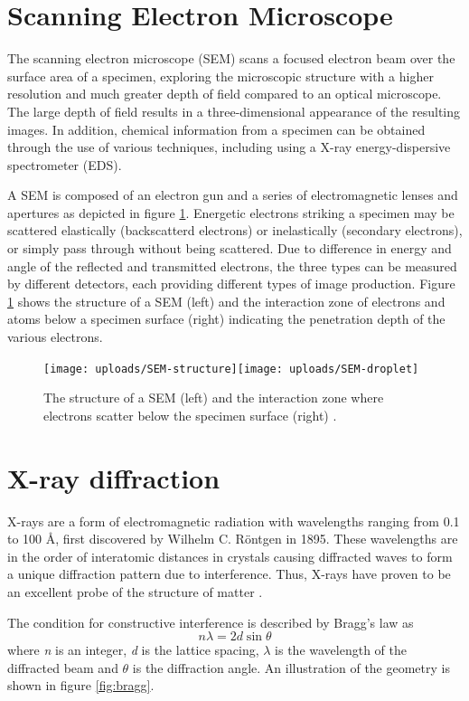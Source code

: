 \documentclass[Main/main.tex]{subfiles}
\begin{document}
\section{Scanning Electron Microscope}
The scanning electron microscope (SEM) scans a focused electron beam over the surface area of a specimen, exploring the microscopic structure with a higher resolution and much greater depth of field compared to an optical microscope. The large depth of field results in a three-dimensional appearance of the resulting images. In addition, chemical information from a specimen can be obtained through the use of various techniques, including using a X-ray energy-dispersive spectrometer (EDS).

A SEM is composed of an electron gun and a series of electromagnetic lenses and apertures as depicted in figure \ref{fig:SEM}. Energetic electrons striking a specimen may be scattered elastically (backscatterd electrons) or inelastically (secondary electrons), or simply pass through without being scattered. Due to difference in energy and angle of the reflected and transmitted electrons, the three types can be measured by different detectors, each providing different types of image production. Figure \ref{fig:SEM} shows the structure of a SEM (left) and the interaction zone of electrons and atoms below a specimen surface (right) indicating the penetration depth of the various electrons. 

\begin{figure}
    \centering
    \texttt{[image: uploads/SEM-structure]}\texttt{[image: uploads/SEM-droplet]}
    \caption{The structure of a SEM (left) \cite{SEM_structure} and the interaction zone where electrons scatter below the specimen surface (right) \cite{SEM_droplet}.}
    \label{fig:SEM}
\end{figure}

\section{X-ray diffraction}
X-rays are a form of electromagnetic radiation with wavelengths ranging from 0.1 to 100 \si{\angstrom}, first discovered by Wilhelm C. Röntgen in 1895. These wavelengths are in the order of interatomic distances in crystals causing diffracted waves to form a unique diffraction pattern due to interference. Thus, X-rays have proven to be an excellent probe of the structure of matter \cite{2_XRD,Scotman}.

The condition for constructive interference is described by Bragg's law as
    $$n\lambda = 2d\sin{\theta}$$
where \textit{n} is an integer, \textit{d} is the lattice spacing, \textit{$\lambda$} is the wavelength of the diffracted beam and \textit{$\theta$} is the diffraction angle. An illustration of the geometry is shown in figure \ref{fig:bragg}.
\end{document}
